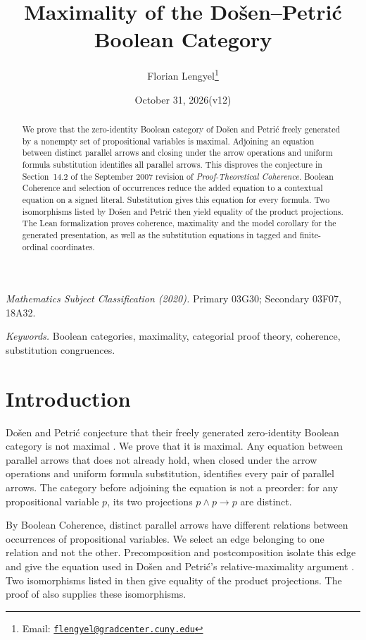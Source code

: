 \documentclass[11pt]{article}
\title{Maximality of the Do\v{s}en--Petri\'c Boolean Category}
\author{Florian Lengyel\thanks{Email: \href{mailto:flengyel@gradcenter.cuny.edu}{\texttt{flengyel@gradcenter.cuny.edu}}}}
\date{October 31, 2026\quad(v12)}
\begin{document}
\maketitle

\begin{abstract}
We prove that the zero-identity Boolean category of Do\v{s}en and
Petri\'c freely generated by a nonempty set of propositional variables
is maximal. Adjoining an equation between distinct parallel arrows
and closing under the arrow operations and uniform formula
substitution identifies all parallel arrows. This disproves the
conjecture in Section~14.2 of the September 2007 revision of
\emph{Proof-Theoretical Coherence}. Boolean Coherence and selection of
occurrences reduce the added equation to a contextual equation on a
signed literal. Substitution gives this equation for every formula.
Two isomorphisms listed by Do\v{s}en and Petri\'c then yield equality
of the product projections. The Lean formalization proves coherence,
maximality and the model corollary for the generated presentation,
as well as the substitution equations in tagged and finite-ordinal
coordinates.
\end{abstract}

\medskip
\noindent\textit{Mathematics Subject Classification (2020).}
Primary 03G30; Secondary 03F07, 18A32.

\smallskip
\noindent\textit{Keywords.} Boolean categories, maximality, categorial proof theory,
coherence, substitution congruences.

\section{Introduction}

Do\v{s}en and Petri\'c conjecture that their freely generated
zero-identity Boolean category is not maximal
\cite[\S14.2, p.~322]{DP}. We prove that it is maximal. Any equation
between parallel arrows that does not already hold, when closed under
the arrow operations and uniform formula substitution, identifies
every pair of parallel arrows. The category before adjoining the
equation is not a preorder: for any propositional variable $p$, its
two projections $p\wedge p\to p$ are distinct.

By Boolean Coherence, distinct parallel arrows have different
relations between occurrences of propositional variables. We select
an edge belonging to one relation and not the other. Precomposition
and postcomposition isolate this edge and give the equation used in
Do\v{s}en and Petri\'c's relative-maximality argument
\cite[\S9.7, pp.~215--216]{DP}. Two isomorphisms listed in
\cite[\S12.5, p.~294]{DP} then give equality of the product projections.
The proof of \cite[Lemma~7]{DPIsomorphic} also supplies these
isomorphisms.
\end{document}

